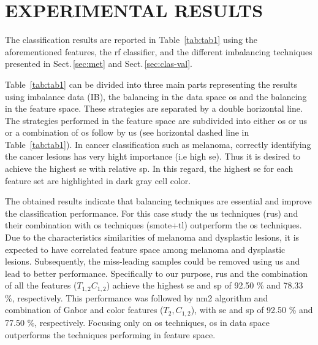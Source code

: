 \graphicspath{ {./content/Experiments-results/figures/} }


\section{\uppercase{Experimental Results}}
\label{sec:exp-res} 

\noindent The classification results are reported in Table~\ref{tab:tab1} using the aforementioned features, the \ac{rf} classifier, and the different imbalancing techniques presented in Sect.\,\ref{sec:met} and Sect.\,\ref{sec:clas-val}. 



Table~\ref{tab:tab1} can be divided into three main parts representing the results using imbalance data (IB), the balancing in the data space \ac{os} and the balancing in the feature space.
These strategies are separated by a double horizontal line.
The strategies performed in the feature space are subdivided into either \ac{os} or \ac{us} or a combination of \ac{os} follow by \ac{us} (see horizontal dashed line in Table~\ref{tab:tab1}).
In cancer classification such as melanoma, correctly identifying the cancer lesions has very hight importance (i.e high \ac{se}). 
Thus it is desired to achieve the highest \ac{se} with relative \ac{sp}. 
In this regard, the highest \ac{se} for each feature set are highlighted in dark gray cell color. 

The obtained results indicate that balancing techniques are essential and improve the classification performance. 
For this case study the \ac{us} techniques (\ac{rus}) and their combination with \ac{os} techniques (\ac{smote}+\ac{tl}) outperform the \ac{os} techniques. 
Due to the characteristics similarities of melanoma and dysplastic lesions, it is expected to have correlated feature space among melanoma and dysplastic lesions. 
Subsequently, the miss-leading samples could be removed using \ac{us} and lead to better performance.
Specifically to our purpose, \ac{rus} and the combination of all the features ($T_{1,2} C_{1,2}$) achieve the highest \ac{se} and \ac{sp} of 92.50 \% and 78.33 \%, respectively.
This performance was followed by \ac{nm2} algorithm and combination of Gabor and color features ($T_{2}, C_{1,2}$), with \ac{se} and \ac{sp} of 92.50 \% and 77.50 \%, respectively.  
Focusing only on \ac{os} techniques, \ac{os} in data space outperforms the techniques performing in feature space.


